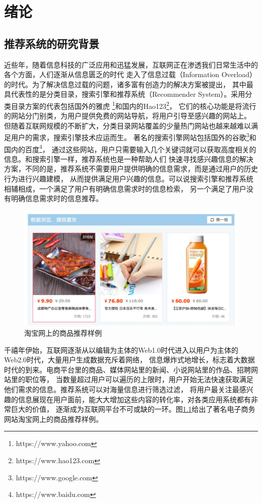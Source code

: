 \chapter{绪论}
\section{推荐系统的研究背景}
近些年，随着信息科技的广泛应用和迅猛发展，互联网正在渗透我们日常生活中的各个方面，人们逐渐从信息匮乏的时代
走入了信息过载（Information Overload）的时代。为了解决信息过载的问题，诸多富有创造力的解决方案被提出，
其中最具代表性的是分类目录，搜索引擎和推荐系统（Recommender System）。采用分类目录方案的代表包括国外的雅虎
\footnote{https://www.yahoo.com}和国内的Hao123\footnote{https://www.hao123.com}，
它们的核心功能是将流行的网站分门别类，为用户提供免费的网站导航，将用户引导至感兴趣的网站上。
但随着互联网规模的不断扩大，分类目录网站覆盖的少量热门网站也越来越难以满足用户的需求，搜索引擎技术应运而生。
著名的搜索引擎网站包括国外的谷歌\footnote{https://www.google.com}和国内的百度\footnote{https://www.baidu.com}，
通过这些网站，用户只需要输入几个关键词就可以获取高度相关的信息。和搜索引擎一样，推荐系统也是一种帮助人们
快速寻找感兴趣信息的解决方案，不同的是，推荐系统不需要用户提供明确的信息需求，而是通过用户的历史行为进行兴趣建模，
从而提供满足用户兴趣的信息。可以说搜索引擎和推荐系统相辅相成，一个满足了用户有明确信息需求时的信息检索，
另一个满足了用户没有明确信息需求时的信息推荐。

\begin{figure}[htbp]
\centering
\includegraphics[scale=0.26]{images/taobao.jpeg}
\caption{淘宝网上的商品推荐样例}
\label{fig:taobao}
\end{figure}

千禧年伊始，互联网逐渐从以编辑为主体的Web1.0时代进入以用户为主体的Web2.0时代，大量用户生成数据充斥着网络，
信息爆炸式地增长，标志着大数据时代的到来。电商平台里的商品、媒体网站里的新闻、小说网站里的作品、招聘网站里的职位等，
当数量超过用户可以遍历的上限时，用户开始无法快速获取满足他们需求的信息。推荐系统可以对海量信息进行筛选过滤，
将用户最关注最感兴趣的信息展现在用户面前，能大大增加这些内容的转化率，对各类应用系统都有非常巨大的价值，
逐渐成为互联网平台不可或缺的一环。图\ref{fig:taobao}给出了著名电子商务网站淘宝网上的商品推荐样例。

